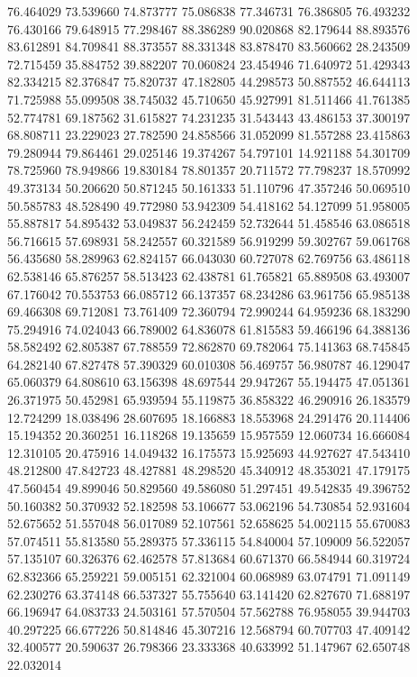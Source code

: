 76.464029
73.539660
74.873777
75.086838
77.346731
76.386805
76.493232
76.430166
79.648915
77.298467
88.386289
90.020868
82.179644
88.893576
83.612891
84.709841
88.373557
88.331348
83.878470
83.560662
28.243509
72.715459
35.884752
39.882207
70.060824
23.454946
71.640972
51.429343
82.334215
82.376847
75.820737
47.182805
44.298573
50.887552
46.644113
71.725988
55.099508
38.745032
45.710650
45.927991
81.511466
41.761385
52.774781
69.187562
31.615827
74.231235
31.543443
43.486153
37.300197
68.808711
23.229023
27.782590
24.858566
31.052099
81.557288
23.415863
79.280944
79.864461
29.025146
19.374267
54.797101
14.921188
54.301709
78.725960
78.949866
19.830184
78.801357
20.711572
77.798237
18.570992
49.373134
50.206620
50.871245
50.161333
51.110796
47.357246
50.069510
50.585783
48.528490
49.772980
53.942309
54.418162
54.127099
51.958005
55.887817
54.895432
53.049837
56.242459
52.732644
51.458546
63.086518
56.716615
57.698931
58.242557
60.321589
56.919299
59.302767
59.061768
56.435680
58.289963
62.824157
66.043030
60.727078
62.769756
63.486118
62.538146
65.876257
58.513423
62.438781
61.765821
65.889508
63.493007
67.176042
70.553753
66.085712
66.137357
68.234286
63.961756
65.985138
69.466308
69.712081
73.761409
72.360794
72.990244
64.959236
68.183290
75.294916
74.024043
66.789002
64.836078
61.815583
59.466196
64.388136
58.582492
62.805387
67.788559
72.862870
69.782064
75.141363
68.745845
64.282140
67.827478
57.390329
60.010308
56.469757
56.980787
46.129047
65.060379
64.808610
63.156398
48.697544
29.947267
55.194475
47.051361
26.371975
50.452981
65.939594
55.119875
36.858322
46.290916
26.183579
12.724299
18.038496
28.607695
18.166883
18.553968
24.291476
20.114406
15.194352
20.360251
16.118268
19.135659
15.957559
12.060734
16.666084
12.310105
20.475916
14.049432
16.175573
15.925693
44.927627
47.543410
48.212800
47.842723
48.427881
48.298520
45.340912
48.353021
47.179175
47.560454
49.899046
50.829560
49.586080
51.297451
49.542835
49.396752
50.160382
50.370932
52.182598
53.106677
53.062196
54.730854
52.931604
52.675652
51.557048
56.017089
52.107561
52.658625
54.002115
55.670083
57.074511
55.813580
55.289375
57.336115
54.840004
57.109009
56.522057
57.135107
60.326376
62.462578
57.813684
60.671370
66.584944
60.319724
62.832366
65.259221
59.005151
62.321004
60.068989
63.074791
71.091149
62.230276
63.374148
66.537327
55.755640
63.141420
62.827670
71.688197
66.196947
64.083733
24.503161
57.570504
57.562788
76.958055
39.944703
40.297225
66.677226
50.814846
45.307216
12.568794
60.707703
47.409142
32.400577
20.590637
26.798366
23.333368
40.633992
51.147967
62.650748
22.032014
